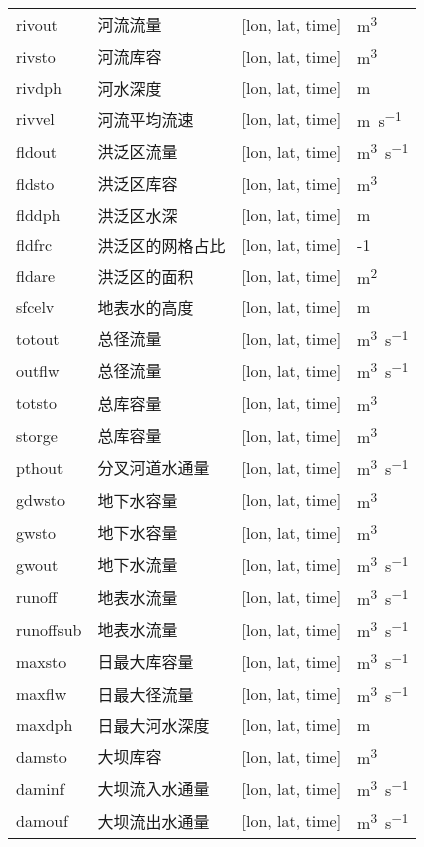 \begin{table}[htbp]
\begin{tabular}{lp{}ll}
rivout & 河流流量 & {[}lon, lat, time{]}  & \unit{m^3} \\
rivsto & 河流库容 & {[}lon, lat, time{]}  & \unit{m^3} \\
rivdph & 河水深度 & {[}lon, lat, time{]}  & \unit{m} \\
rivvel & 河流平均流速 & {[}lon, lat, time{]}  & \unit{m.s^{-1}} \\
fldout & 洪泛区流量 & {[}lon, lat, time{]}  & \unit{m^3.s^{-1}} \\
fldsto & 洪泛区库容 & {[}lon, lat, time{]}  & \unit{m^3} \\
flddph & 洪泛区水深 & {[}lon, lat, time{]}  & \unit{m} \\ %
fldfrc & 洪泛区的网格占比 & {[}lon, lat, time{]}  & \textquotesingle0-1\textquotesingle{} \\
fldare & 洪泛区的面积 & {[}lon, lat, time{]}  & \unit{m^2} \\
sfcelv & 地表水的高度 & {[}lon, lat, time{]}  & \unit{m} \\
totout & 总径流量 & {[}lon, lat, time{]}  & \unit{m^3.s^{-1}} \\
outflw & 总径流量 & {[}lon, lat, time{]}  & \unit{m^3.s^{-1}} \\
totsto & 总库容量 & {[}lon, lat, time{]}  & \unit{m^3} \\
storge & 总库容量 & {[}lon, lat, time{]}  & \unit{m^3} \\
pthout & 分叉河道水通量 & {[}lon, lat, time{]}  & \unit{m^3.s^{-1}} \\
gdwsto & 地下水容量 & {[}lon, lat, time{]}  & \unit{m^3} \\
gwsto & 地下水容量 & {[}lon, lat, time{]}  & \unit{m^3} \\
gwout & 地下水流量 & {[}lon, lat, time{]}  & \unit{m^3.s^{-1}} \\
runoff & 地表水流量 & {[}lon, lat, time{]}  & \unit{m^3.s^{-1}} \\
runoffsub & 地表水流量 & {[}lon, lat, time{]}  & \unit{m^3.s^{-1}} \\
maxsto & 日最大库容量 & {[}lon, lat, time{]}  & \unit{m^3.s^{-1}} \\
maxflw & 日最大径流量 & {[}lon, lat, time{]}  & \unit{m^3.s^{-1}} \\
maxdph & 日最大河水深度 & {[}lon, lat, time{]}  & \unit{m} \\
damsto & 大坝库容 & {[}lon, lat, time{]}  & \unit{m^3} \\
daminf & 大坝流入水通量 & {[}lon, lat, time{]}  & \unit{m^3.s^{-1}} \\
damouf & 大坝流出水通量 & {[}lon, lat, time{]}  & \unit{m^3.s^{-1}} \\
\bottomrule
\end{tabular}
\end{table}

